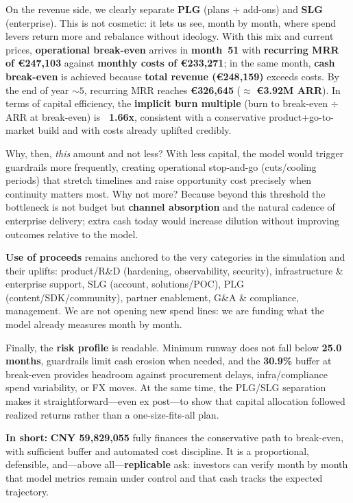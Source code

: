 On the revenue side, we clearly separate \textbf{PLG} (plans + add-ons) and \textbf{SLG} (enterprise). This is not cosmetic: it lets us see, month by month, where spend levers return more and rebalance without ideology. With this mix and current prices, \textbf{operational break-even} arrives in \textbf{month~51} with \textbf{recurring MRR of €247{,}103} against \textbf{monthly costs of €233{,}271}; in the same month, \textbf{cash break-even} is achieved because \textbf{total revenue (€248{,}159)} exceeds costs. By the end of year $\sim 5$, recurring MRR reaches \textbf{€326{,}645} ($\approx$ \textbf{€3.92M ARR}). In terms of capital efficiency, the \textbf{implicit burn multiple} (burn to break-even $\div$ ARR at break-even) is \textbf{~1.66x}, consistent with a conservative product+go-to-market build and with costs already uplifted credibly.

Why, then, \emph{this} amount and not less? With less capital, the model would trigger guardrails more frequently, creating operational stop-and-go (cuts/cooling periods) that stretch timelines and raise opportunity cost precisely when continuity matters most. Why not more? Because beyond this threshold the bottleneck is not budget but \textbf{channel absorption} and the natural cadence of enterprise delivery; extra cash today would increase dilution without improving outcomes relative to the model.

\textbf{Use of proceeds} remains anchored to the very categories in the simulation and their uplifts: product/R\&D (hardening, observability, security), infrastructure \& enterprise support, SLG (account, solutions/POC), PLG (content/SDK/community), partner enablement, G\&A \& compliance, management. We are not opening new spend lines: we are funding what the model already measures month by month. 

Finally, the \textbf{risk profile} is readable. Minimum runway does not fall below \textbf{25.0 months}, guardrails limit cash erosion when needed, and the \textbf{30.9\%} buffer at break-even provides headroom against procurement delays, infra/compliance spend variability, or FX moves. At the same time, the PLG/SLG separation makes it straightforward—even ex post—to show that capital allocation followed realized returns rather than a one-size-fits-all plan.

\textbf{In short:} \textbf{CNY 59{,}829{,}055} fully finances the conservative path to break-even, with sufficient buffer and automated cost discipline. It is a proportional, defensible, and—above all—\textbf{replicable} ask: investors can verify month by month that model metrics remain under control and that cash tracks the expected trajectory.

